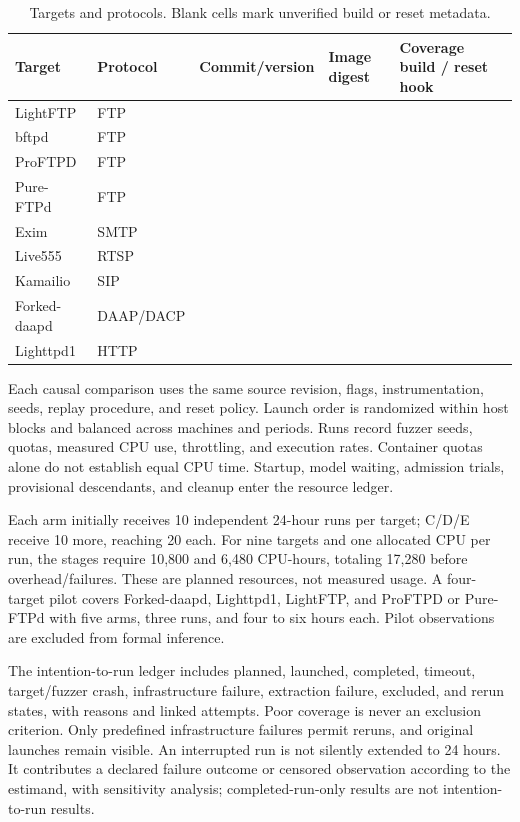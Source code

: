 \documentclass[final,5p,times,number]{elsarticle}
\newcommand{\missing}{\mbox{}}
\begin{document}
\begin{table}[!tbp]
\centering\small
\caption{Targets and protocols. Blank cells mark unverified build or reset metadata.}
\label{tab:targets}
\begin{tabularx}{\textwidth}{l l Y Y Y}
\toprule
Target & Protocol & Commit/version & Image digest & Coverage build / reset hook \\
\midrule
LightFTP & FTP & \missing & \missing & \missing \\
bftpd & FTP & \missing & \missing & \missing \\
ProFTPD & FTP & \missing & \missing & \missing \\
Pure-FTPd & FTP & \missing & \missing & \missing \\
Exim & SMTP & \missing & \missing & \missing \\
Live555 & RTSP & \missing & \missing & \missing \\
Kamailio & SIP & \missing & \missing & \missing \\
Forked-daapd & DAAP/DACP & \missing & \missing & \missing \\
Lighttpd1 & HTTP & \missing & \missing & \missing \\
\bottomrule
\end{tabularx}
\end{table}

Each causal comparison uses the same source revision, flags, instrumentation, seeds, replay procedure, and reset policy. Launch order is randomized within host blocks and balanced across machines and periods. Runs record fuzzer seeds, quotas, measured CPU use, throttling, and execution rates. Container quotas alone do not establish equal CPU time. Startup, model waiting, admission trials, provisional descendants, and cleanup enter the resource ledger.

Each arm initially receives 10 independent 24-hour runs per target; C/D/E receive 10 more, reaching 20 each. For nine targets and one allocated CPU per run, the stages require 10,800 and 6,480 CPU-hours, totaling 17,280 before overhead/failures. These are planned resources, not measured usage. A four-target pilot covers Forked-daapd, Lighttpd1, LightFTP, and ProFTPD or Pure-FTPd with five arms, three runs, and four to six hours each. Pilot observations are excluded from formal inference.

The intention-to-run ledger includes planned, launched, completed, timeout, target/fuzzer crash, infrastructure failure, extraction failure, excluded, and rerun states, with reasons and linked attempts. Poor coverage is never an exclusion criterion. Only predefined infrastructure failures permit reruns, and original launches remain visible. An interrupted run is not silently extended to 24 hours. It contributes a declared failure outcome or censored observation according to the estimand, with sensitivity analysis; completed-run-only results are not intention-to-run results.
\end{document}
